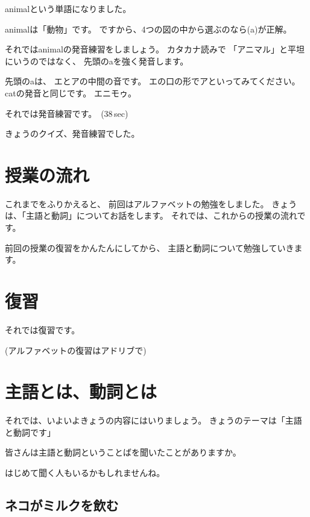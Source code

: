 \documentclass[book,jafontscale=0.9247]{jlreq}
\begin{document}
animalという単語になりました。

animalは「動物」です。
ですから、4つの図の中から選ぶのなら(a)が正解。

それではanimalの発音練習をしましょう。
カタカナ読みで
「アニマル」と平坦にいうのではなく、
先頭のaを強く発音します。

先頭のaは、
エとアの中間の音です。
エの口の形でアといってみてください。
catの発音と同じです。
エニモゥ。

それでは発音練習です。
\faVolumeUp\,(38\,sec)

きょうのクイズ、発音練習でした。

{\large \ComputerMouse}

\newpage
\section{授業の流れ}

これまでをふりかえると、
前回はアルファベットの勉強をしました。
きょうは、「主語と動詞」についてお話をします。
それでは、これからの授業の流れです。

{\large \ComputerMouse}

前回の授業の復習をかんたんにしてから、
主語と動詞について勉強していきます。

{\large \ComputerMouse}

\section{復習}

それでは復習です。

{\large \ComputerMouse}

(アルファベットの復習はアドリブで)

{\large \ComputerMouse}

\section{主語とは、動詞とは}
それでは、いよいよきょうの内容にはいりましょう。
きょうのテーマは「主語と動詞です」

皆さんは主語と動詞ということばを聞いたことがありますか。

はじめて聞く人もいるかもしれませんね。

{\large \ComputerMouse}

\subsection{ネコがミルクを飲む}
\end{document}
